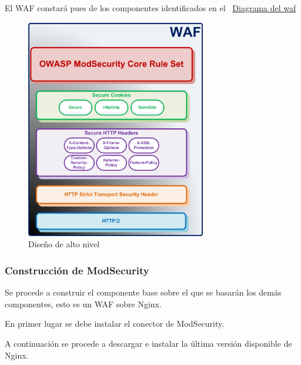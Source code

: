 \clearpage
\par El WAF constará pues de los componentes identificados en el {~\hyperref[fig:Diagrama_WAF_Componentes]{Diagrama del \acrshort{waf}}}
\begin{figure}[!ht]
  \centering
  \label{fig:Diagrama_WAF_Componentes}
  \includegraphics[width=0.7\textwidth]{fig/Diagrama_WAF_Componentes}
  \caption{Diseño de alto nivel}
\end{figure}

\subsubsection{Construcción de ModSecurity}
\par Se procede a construir el componente base sobre el que se basarán los demás componentes, esto es un WAF sobre Nginx.
\par En primer lugar se debe instalar el conector de ModSecurity.
  

\par A continuación se procede a descargar e instalar la última versión disponible de Nginx. \\
\begin{minipage}{\linewidth}
  
\end{minipage}

